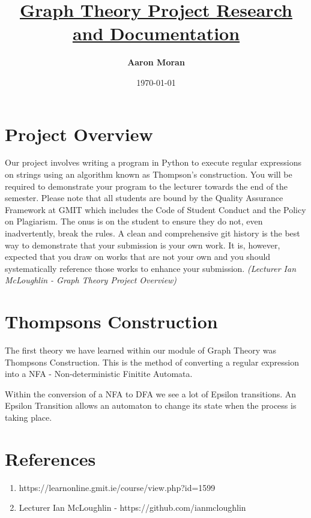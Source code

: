 \documentclass[11pt]{article}
\title{\underline{\textbf{ Graph Theory Project Research and Documentation}}}
\author{\textbf{Aaron Moran }}
\date{\today}
\begin{document}
\maketitle	
\pagebreak




\section{Project Overview}
Our project involves writing a program in Python to execute regular expressions on
strings using an algorithm known as Thompson’s construction.
You will be required to
demonstrate your program to the lecturer towards the end of the semester.
Please note that all students are bound by the Quality Assurance Framework at GMIT which includes the Code of Student Conduct and the
Policy on Plagiarism. The onus is on the student to ensure they do not, even
inadvertently, break the rules. A clean and comprehensive git history
 is the best way to demonstrate that your submission is your own
work. It is, however, expected that you draw on works that are not your
own and you should systematically reference those works to enhance your
submission. 
\newline
\emph{(Lecturer Ian McLoughlin - Graph Theory Project Overview)}

\newpage


\section{Thompsons Construction}

The first theory we have learned within  our module of Graph Theory was Thompsons Construction.
This is the method of converting a regular expression into a NFA - Non-deterministic Finitite Automata.

Within the conversion of a NFA to DFA we see a lot of Epsilon transitions. An Epsilon Transition allows an automaton to change its state when the process is taking place.

\newpage

\section{References}

\begin{enumerate}
\item https://learnonline.gmit.ie/course/view.php?id=1599
\item Lecturer Ian McLoughlin - https://github.com/ianmcloughlin
\end{enumerate}
\end{document}
